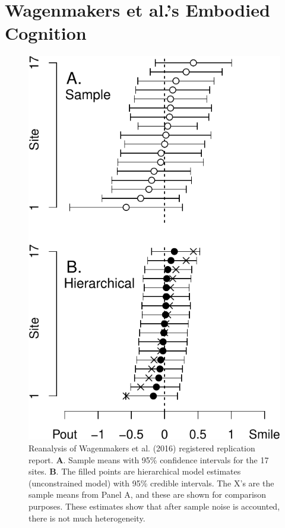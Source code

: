 \documentclass[english,man]{apa6}
\theoremstyle{definition}
\theoremstyle{definition}
\theoremstyle{remark}
\begin{document}
\section{Wagenmakers et al.'s Embodied
Cognition}\label{wagenmakers-et-al.s-embodied-cognition}

\begin{figure}[htbp]
\centering
\includegraphics{p_files/figure-latex/wagEst-1.pdf}
\caption{\label{fig:wagEst}Reanalysis of Wagenmakers et al. (2016)
registered replication report. \textbf{A}. Sample means with 95\%
confidence intervals for the 17 sites. \textbf{B}. The filled points are
hierarchical model estimates (unconstrained model) with 95\% credible
intervals. The X's are the sample means from Panel A, and these are
shown for comparison purposes. These estimates show that after sample
noise is accounted, there is not much heterogeneity.}
\end{figure}
\end{document}
